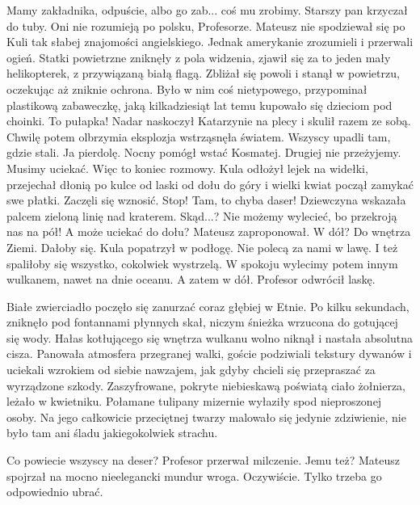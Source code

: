 \begin{dialogue}
\ds{} Mamy zakładnika, odpuście, albo go zab... coś mu zrobimy. \dm{} Starszy pan krzyczał do tuby.
\ds{} Oni nie rozumieją po polsku, Profesorze.
\ds{}  \dm{} Mateusz nie spodziewał się po Kuli tak słabej znajomości angielskiego. Jednak amerykanie zrozumieli i przerwali ogień.
\ds{}  \dm{} Statki powietrzne zniknęły z pola widzenia, zjawił się za to jeden mały helikopterek, z przywiązaną białą flagą.
Zbliżał się powoli i stanął w powietrzu, oczekując aż zniknie ochrona. Było w nim coś nietypowego, przypominał plastikową zabaweczkę, jaką kilkadziesiąt lat temu kupowało się dzieciom pod choinki.
\ds{} To pułapka! \dm{} Nadar naskoczył Katarzynie na plecy i skulił razem ze sobą. Chwilę potem olbrzymia eksplozja wstrząsnęła światem. Wszyscy upadli tam, gdzie stali.
\ds{} Ja pierdolę. \dm{} Nocny pomógł wstać Kosmatej. \dm{} Drugiej nie przeżyjemy. Musimy uciekać.
\ds{} Więc to koniec rozmowy. \dm{} Kula odłożył lejek na widełki, przejechał dłonią po kulce od laski od dołu do góry i wielki kwiat począł zamykać swe płatki. Zaczęli się wznosić.
\ds{} Stop! Tam, to chyba daser! \dm{} Dziewczyna wskazała palcem zieloną linię nad kraterem.
\ds{} Skąd...?
\ds{} Nie możemy wylecieć, bo przekroją nas na pół!
\ds{} A może uciekać do dołu? \dm{} Mateusz zaproponował.
\ds{} W dół?
\ds{} Do wnętrza Ziemi.
\ds{} Dałoby się. \dm{} Kula popatrzył w podłogę.
\ds{} Nie polecą za nami w lawę.
\ds{} I też spaliłoby się wszystko, cokolwiek wystrzelą.
\ds{} W spokoju wylecimy potem innym wulkanem, nawet na dnie oceanu.
\ds{} A zatem w dół. \dm{} Profesor odwrócił laskę.
\end{dialogue}

Białe zwierciadło poczęło się zanurzać coraz głębiej w Etnie.
Po kilku sekundach, zniknęło pod fontannami płynnych skał, niczym śnieżka wrzucona do gotującej się wody.
Hałas kotłującego się wnętrza wulkanu wolno niknął i nastała absolutna cisza.
Panowała atmosfera przegranej walki, goście podziwiali tekstury dywanów i uciekali wzrokiem od siebie nawzajem, jak gdyby chcieli się przepraszać za wyrządzone szkody.
Zaszyfrowane, pokryte niebieskawą poświatą ciało żołnierza, leżało w kwietniku.
Połamane tulipany mizernie wyłaziły spod nieproszonej osoby.
Na jego całkowicie przeciętnej twarzy malowało się jedynie zdziwienie, nie było tam ani śladu jakiegokolwiek strachu.

\begin{dialogue}
\ds{} Co powiecie wszyscy na deser? \dm{} Profesor przerwał milczenie.
\ds{} Jemu też? \dm{} Mateusz spojrzał na mocno nieelegancki mundur wroga.
\ds{} Oczywiście. Tylko trzeba go odpowiednio ubrać.
\end{dialogue}

